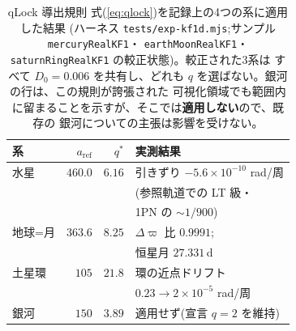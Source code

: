 \documentclass[a4paper,10pt,twocolumn]{ltjsarticle}
\begin{document}
\begin{table}[t]
\centering
\caption{qLock 導出規則 式(\ref{eq:qlock})を記録上の4つの系に適用した結果
  (ハーネス \texttt{tests/exp-kf1d.mjs};サンプル \texttt{mercuryRealKF1}・
  \texttt{earthMoonRealKF1}・\texttt{saturnRingRealKF1} の較正状態)。較正された3系は
  すべて $D_0=0.006$ を共有し、どれも $q$ を選ばない。銀河の行は、この規則が誇張された
  可視化領域でも範囲内に留まることを示すが、そこでは\textbf{適用しない}ので、既存の
  銀河についての主張は影響を受けない。}
\label{tab:qlock}
\begin{tabular}{lrrl}
\toprule
系 & $a_{\mathrm{ref}}$ & $q^{*}$ & 実測結果 \\
\midrule
水星 & $460.0$ & $6.16$ & 引きずり $-5.6{\times}10^{-10}$ rad/周 \\
 & & & (参照軌道での LT 級・ \\
 & & & 1PN の ${\sim}1/900$) \\
地球=月 & $363.6$ & $8.25$ & $\Delta\varpi$ 比 $0.9991$; \\
 & & & 恒星月 $27.331$\,d \\
土星環 & $105$ & $21.8$ & 環の近点ドリフト \\
 & & & $0.23\to2{\times}10^{-5}$ rad/周 \\
銀河 & $150$ & $3.89$ & 適用せず(宣言 $q=2$ を維持) \\
\bottomrule
\end{tabular}
\end{table}
\end{document}
